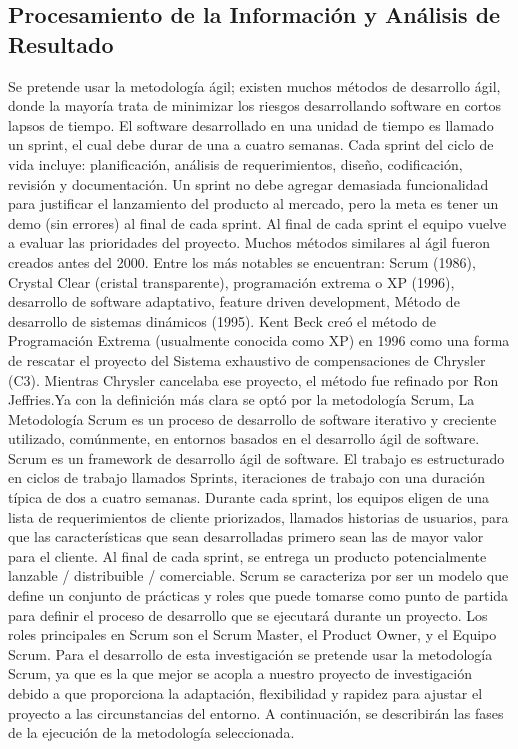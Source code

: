 \documentclass[12pt,a4paper,oneside]{article}
\begin{document}
\subsection{Procesamiento de la Información y Análisis de Resultado}
Se pretende usar la metodología ágil; existen muchos métodos de desarrollo ágil, donde la mayoría trata de minimizar los riesgos desarrollando software en cortos lapsos de tiempo. El software desarrollado en una unidad de tiempo es llamado un sprint, el cual debe durar de una a cuatro semanas. Cada sprint del ciclo de vida incluye: planificación, análisis de requerimientos, diseño, codificación, revisión y documentación. Un sprint no debe agregar demasiada funcionalidad para justificar el lanzamiento del producto al mercado, pero la meta es tener un demo (sin errores) al final de cada sprint. Al final de cada sprint el equipo vuelve a evaluar las prioridades del proyecto. Muchos métodos similares al ágil fueron creados antes del 2000. Entre los más notables se encuentran: Scrum (1986), Crystal Clear (cristal transparente), programación extrema o XP (1996), desarrollo de software adaptativo, feature driven development, Método de desarrollo de sistemas dinámicos (1995). Kent Beck creó el método de Programación Extrema (usualmente conocida como XP) en 1996 como una forma de rescatar el proyecto del Sistema exhaustivo de compensaciones de Chrysler (C3). Mientras Chrysler cancelaba ese proyecto, el método fue refinado por Ron Jeffries.Ya con la definición más clara se optó por la metodología Scrum, La Metodología Scrum es un proceso de desarrollo de software iterativo y creciente utilizado, comúnmente, en entornos basados en el desarrollo ágil de software. Scrum es un framework de desarrollo ágil de software. El trabajo es estructurado en ciclos de trabajo llamados Sprints, iteraciones de trabajo con una duración típica de dos a cuatro semanas. Durante cada sprint, los equipos eligen de una lista de requerimientos de cliente priorizados, llamados historias de usuarios, para que las características que sean desarrolladas primero sean las de mayor valor para el cliente. Al final de cada sprint, se entrega un producto potencialmente lanzable / distribuible / comerciable. Scrum se caracteriza por ser un modelo que define un conjunto de prácticas y roles que puede tomarse como punto de partida para definir el proceso de desarrollo que se ejecutará durante un proyecto. Los roles principales en Scrum son el Scrum Master, el Product Owner, y el Equipo Scrum. Para el desarrollo de esta investigación se pretende usar la metodología Scrum, ya que es la que mejor se acopla a nuestro proyecto de investigación debido a que proporciona la adaptación, flexibilidad y rapidez para ajustar el proyecto a las circunstancias del entorno. A continuación, se describirán las fases de la ejecución de la metodología seleccionada.
\end{document}
